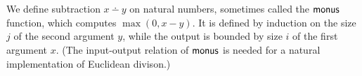 \newcommand{\apred}{\AgdaFunction{pred}}
\newcommand{\amonus}{\AgdaFunction{monus}}
\newcommand{\arefl}{\AgdaInductiveConstructor{refl}}
\newcommand{\azero}{\AgdaInductiveConstructor{zero}}
\newcommand{\asuc}{\AgdaInductiveConstructor{suc}}
\newcommand{\aNat}{\AgdaDatatype{Nat}}

\begin{code}%
\>[0]\AgdaSpace{}%
\AgdaSpace{}%
\AgdaSymbol{:}\AgdaSpace{}%
\AgdaSpace{}%
\AgdaSpace{}%
\AgdaSpace{}%
\<%
\\
\>[0][@{}l@{\AgdaIndent{0}}]%
\>[2]%
\>[8]\AgdaSymbol{:}%
\>[11]\AgdaSpace{}%
\AgdaSpace{}%
\AgdaSpace{}%
\AgdaSpace{}%
\AgdaSymbol{(}\AgdaSpace{}%
\AgdaFunction{+}\AgdaSpace{}%
\AgdaSymbol{)}\<%
\\
\>[0][@{}l@{\AgdaIndent{0}}]%
\>[2]%
\>[8]\AgdaSymbol{:}%
\>[11]\AgdaSpace{}%
\AgdaSpace{}%
\AgdaSpace{}%
\AgdaSpace{}%
\AgdaSpace{}%
\AgdaSpace{}%
\AgdaSpace{}%
\AgdaSymbol{(}\AgdaSpace{}%
\AgdaFunction{+}\AgdaSpace{}%
\AgdaSymbol{)}\<%
\end{code}

We define subtraction $x \dotminus y$ on natural numbers, sometimes
called the $\amonus$ function, which computes $\max(0, x-y)$.  It is
defined by induction on the size $j$ of the second argument $y$, while
the output is bounded by size $i$ of the first argument $x$.  (The
input-output relation of $\amonus$ is needed for a natural
implementation of Euclidean divison.)

